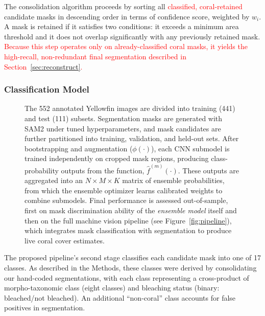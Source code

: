 \documentclass[11pt]{elsarticle}
\newcommand{\revadd}[1]{\textcolor{red}{#1}}
\newcommand{\revdel}[1]{%
  \sbox\revdelbox{#1}%
  \makebox[0pt][l]{\raisebox{0.45ex}{\rule{\wd\revdelbox}{0.4pt}}}\usebox\revdelbox
}
\begin{document}
The consolidation algorithm proceeds by sorting all \revadd{classified, coral-retained} candidate masks in descending order in terms of confidence score, weighted by $w_i$. A mask is retained if it satisfies two conditions: it exceeds a minimum area threshold and it does not overlap significantly with any previously retained mask.
\revadd{Because this step operates only on already-classified coral masks, it yields the high-recall, non-redundant final segmentation described in Section~\ref{sec:reconstruct}.}

\subsubsection{Classification Model}
\label{sec:cnn}

\begin{figure}
    \centering
    \resizebox{0.9\textheight}{!}{%
        
    }
    \caption{The 552 annotated Yellowfin images are divided into training (441) and test (111) subsets. Segmentation masks are generated with SAM2 under tuned hyperparameters, and mask candidates are further partitioned into training, validation, and held-out sets. After bootstrapping and augmentation ($\phi(\cdot)$), each CNN submodel is trained independently on cropped mask regions, producing class-probability outputs from the function, $\hat{f}^{(m)}(\cdot)$. These outputs are aggregated into an $N \times M \times K$ matrix of ensemble probabilities, from which the ensemble optimizer learns calibrated weights to combine submodels. Final performance is assessed out-of-sample, first on mask discrimination ability of the \emph{ensemble model} itself and then on the full machine vision pipeline (see Figure~\ref{fig:pipeline}), which integrates mask classification with segmentation to produce live coral cover estimates.}
    \label{fig:training_pipeline}
\end{figure}

The proposed pipeline's second stage classifies each candidate mask\revdel{ $m_i$} into one of 17 classes. As described in the Methods, these classes were derived by consolidating our hand-coded segmentations, with each class representing a cross-product of morpho-taxonomic class (eight classes) and bleaching status (binary: bleached/not bleached). An additional ``non-coral'' class accounts for false positives in segmentation.
\end{document}
